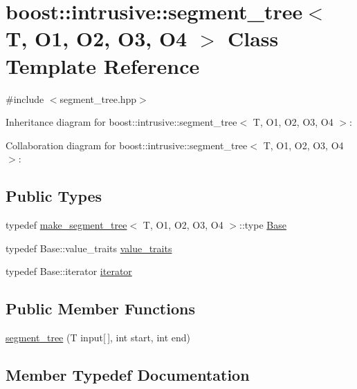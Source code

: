 \hypertarget{classboost_1_1intrusive_1_1segment__tree}{}\section{boost\+:\+:intrusive\+:\+:segment\+\_\+tree$<$ T, O1, O2, O3, O4 $>$ Class Template Reference}
\label{classboost_1_1intrusive_1_1segment__tree}


{\ttfamily \#include $<$segment\+\_\+tree.\+hpp$>$}



Inheritance diagram for boost\+:\+:intrusive\+:\+:segment\+\_\+tree$<$ T, O1, O2, O3, O4 $>$\+:


Collaboration diagram for boost\+:\+:intrusive\+:\+:segment\+\_\+tree$<$ T, O1, O2, O3, O4 $>$\+:
\subsection*{Public Types}
\begin{DoxyCompactItemize}
\item 
typedef \hyperlink{structboost_1_1intrusive_1_1make__segment__tree}{make\+\_\+segment\+\_\+tree}$<$ T, O1, O2, O3, O4 $>$\+::type \hyperlink{classboost_1_1intrusive_1_1segment__tree_a56984f6fac5fb61618c53ca07704cf45}{Base}
\item 
typedef Base\+::value\+\_\+traits \hyperlink{classboost_1_1intrusive_1_1segment__tree_aaff3016f655ec2b1dfe44282913cefea}{value\+\_\+traits}
\item 
typedef Base\+::iterator \hyperlink{classboost_1_1intrusive_1_1segment__tree_a20e4825aed9b33d2de0b7f4177bacd7b}{iterator}
\end{DoxyCompactItemize}
\subsection*{Public Member Functions}
\begin{DoxyCompactItemize}
\item 
\hyperlink{classboost_1_1intrusive_1_1segment__tree_a30f63674d219804557316b5c58154d5c}{segment\+\_\+tree} (T input\mbox{[}$\,$\mbox{]}, int start, int end)
\end{DoxyCompactItemize}


\subsection{Member Typedef Documentation}
\mbox{\label{classboost_1_1intrusive_1_1segment__tree_a56984f6fac5fb61618c53ca07704cf45}} 
